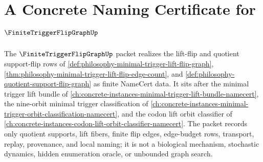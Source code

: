 \chapter{A Concrete Naming Certificate for $\FiniteTriggerFlipGraphUp$}
\label{ch:concrete-instances-finite-trigger-flip-graph-namecert}

The $\FiniteTriggerFlipGraphUp$ packet realizes the lift-flip and quotient support-flip rows of \autoref{def:philosophy-minimal-trigger-lift-flip-graph}, \autoref{thm:philosophy-minimal-trigger-lift-flip-edge-count}, and \autoref{def:philosophy-quotient-support-flip-graph} as finite NameCert data. It sits after the minimal trigger lift bundle of \autoref{ch:concrete-instances-minimal-trigger-lift-bundle-namecert}, the nine-orbit minimal trigger classification of \autoref{ch:concrete-instances-minimal-trigger-orbit-classification-namecert}, and the codon lift orbit classifier of \autoref{ch:concrete-instances-codon-lift-orbit-classifier-namecert}. The packet records only quotient supports, lift fibers, finite flip edges, edge-budget rows, transport, replay, provenance, and local naming; it is not a biological mechanism, stochastic dynamics, hidden enumeration oracle, or unbounded graph search.

